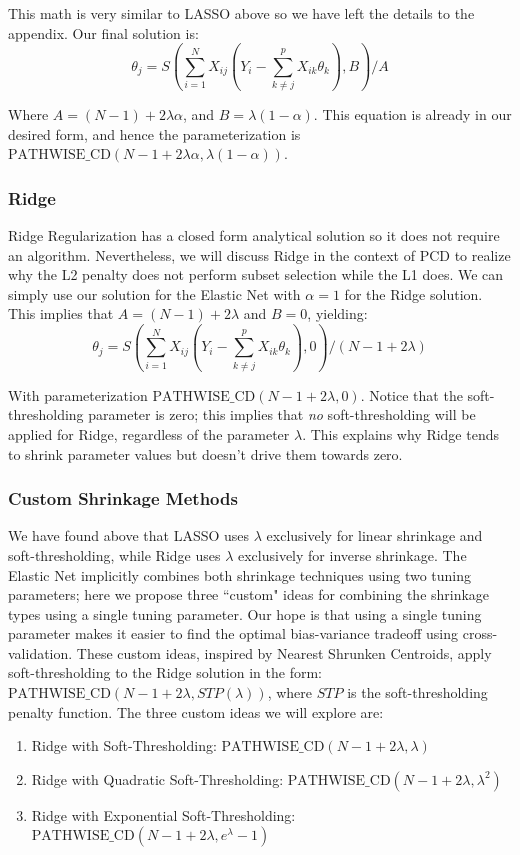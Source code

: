 \documentclass[11pt]{article}
\newcommand{\pcd}{\text{PATHWISE\_CD}}
\begin{document}
This math is very similar to LASSO above so we have left the details to the appendix.  Our final solution is:
	$$\theta_j = S\left(\sum\limits_{i=1}^N X_{ij}(Y_i - \sum\limits_{k \ne j}^p X_{ik}\theta_k), B\right)/A$$

Where $A=(N-1)+2\lambda\alpha$, and $B=\lambda(1-\alpha)$.  This equation is already in our desired form, and hence the parameterization is $\pcd(N-1+2\lambda\alpha,\lambda(1-\alpha))$.  

\subsubsection{Ridge}
Ridge Regularization has a closed form analytical solution so it does not require an algorithm.  Nevertheless, we will discuss Ridge in the context of PCD to realize why the L2 penalty does not perform subset selection while the L1 does.  We can simply use our solution for the Elastic Net with $\alpha=1$ for the Ridge solution.  This implies that $A=(N-1)+2\lambda$ and $B=0$, yielding:
	$$\theta_j = S\left(\sum\limits_{i=1}^N X_{ij}(Y_i - \sum\limits_{k \ne j}^p X_{ik}\theta_k), 0\right)/(N-1+2\lambda)$$

With parameterization $\pcd(N-1+2\lambda,0)$.  Notice that the soft-thresholding parameter is zero; this implies that \textit{no} soft-thresholding will be applied for Ridge, regardless of the parameter $\lambda$.  This explains why Ridge tends to shrink parameter values but doesn't drive them towards zero.  

\subsubsection{Custom Shrinkage Methods}
\label{csm}
We have found above that LASSO uses $\lambda$ exclusively for linear shrinkage and soft-thresholding, while Ridge uses $\lambda$ exclusively for inverse shrinkage.  The Elastic Net implicitly combines both shrinkage techniques using two tuning parameters; here we propose three ``custom" ideas for combining the shrinkage types using a single tuning parameter.  Our hope is that using a single tuning parameter makes it easier to find the optimal bias-variance tradeoff using cross-validation.  These custom ideas, inspired by Nearest Shrunken Centroids, apply soft-thresholding to the Ridge solution in the form: $\pcd(N-1 + 2\lambda, STP(\lambda))$, where $STP$ is the soft-thresholding penalty function.  The three custom ideas we will explore are:
\begin{enumerate}
	\item Ridge with Soft-Thresholding: $\pcd(N-1 + 2\lambda, \lambda)$
	\item Ridge with Quadratic Soft-Thresholding: $\pcd(N-1 + 2\lambda, \lambda^2)$
	\item Ridge with Exponential Soft-Thresholding: $\pcd(N-1 + 2\lambda, e^\lambda-1)$
\end{enumerate}
\end{document}
